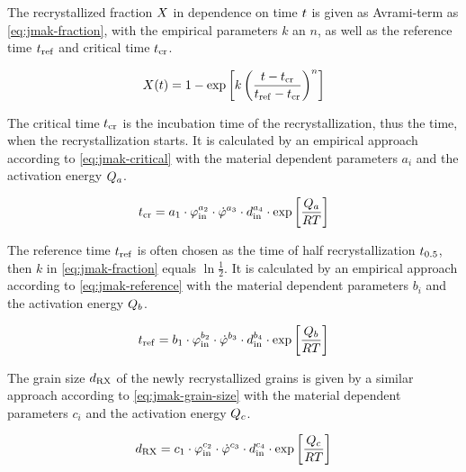 The recrystallized fraction ${X}$ in dependence on time ${t}$ is given as Avrami-term as \autoref{eq:jmak-fraction}, with the empirical parameters $k$ an $n$, as well as the reference time ${t}_{\mathrm{ref}}$ and critical time ${t}_{{\mathrm{cr}}}$.

\begin{equation}
    {X}({t}) = 1 - \exp \left[ k \left( \frac{{t} - {t}_{\mathrm{cr}}}{{t}_{\mathrm{ref}} - {t}_{\mathrm{cr}}} \right)^n \right]
    \label{eq:jmak-fraction}
\end{equation}

The critical time ${t}_{\mathrm{cr}}$ is the incubation time of the recrystallization, thus the time, when the recrystallization starts.
It is calculated by an empirical approach according to \autoref{eq:jmak-critical} with the material dependent parameters $a_i$ and the activation energy ${Q}_a$.

\begin{equation}
    {t}_{{\mathrm{cr}}} = a_1 \cdot {\varphi}_{{\mathrm{in}}}^{a_2} \cdot {\dot{\varphi}}^{a_3} \cdot {d}_{{\mathrm{in}}}^{a_4} \cdot \exp \left[ \frac{{Q}_a}{{R} {T}} \right]
    \label{eq:jmak-critical}
\end{equation}

The reference time ${t}_{\mathrm{ref}}$ is often chosen as the time of half recrystallization ${t}_{0.5}$, then $k$ in \autoref{eq:jmak-fraction} equals $\ln \frac12$.
It is calculated by an empirical approach according to \autoref{eq:jmak-reference} with the material dependent parameters $b_i$ and the activation energy ${Q}_b$.

\begin{equation}
    {t}_{{\mathrm{ref}}} = b_1 \cdot {\varphi}_{{\mathrm{in}}}^{b_2} \cdot {\dot{\varphi}}^{b_3} \cdot {d}_{{\mathrm{in}}}^{b_4} \cdot \exp \left[ \frac{{Q}_b}{{R} {T}} \right]
    \label{eq:jmak-reference}
\end{equation}

The grain size ${d}_{\mathrm{RX}}$ of the newly recrystallized grains is given by a similar approach according to \autoref{eq:jmak-grain-size} with the material dependent parameters $c_i$ and the activation energy ${Q}_c$.

\begin{equation}
    {d}_{\mathrm{RX}} = c_1 \cdot {\varphi}_{{\mathrm{in}}}^{c_2} \cdot {\dot{\varphi}}^{c_3} \cdot {d}_{{\mathrm{in}}}^{c_4} \cdot \exp \left[ \frac{{Q}_c}{{R} {T}} \right]
    \label{eq:jmak-grain-size}
\end{equation}

